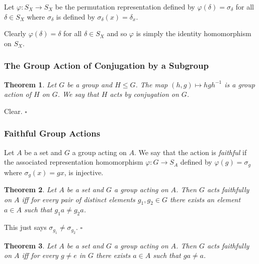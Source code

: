 \documentclass[10pt]{article}
\newtheorem{theorem}{Theorem}[section]
\newenvironment{proof}[1][Proof]{\begin{trivlist}
\item[\hskip \labelsep {\itshape #1}]}{\end{trivlist}}
\newenvironment{definition}[1][Definition]{\begin{trivlist}
\item[\hskip \labelsep {\bfseries #1}]}{\end{trivlist}}
\begin{document}
Let $\varphi : S_X \to S_X$ be the permutation representation defined by $\varphi(\delta) = \sigma_{\delta}$ for all $\delta \in S_X$ where $\sigma_\delta$ is defined by $\sigma_\delta(x) = \delta_x$.

Clearly $\varphi(\delta) = \delta$ for all $\delta \in S_X$ and so $\varphi$ is simply the identity homomorphism on $S_X$.

\subsubsection{The Group Action of Conjugation by a Subgroup}

\begin{theorem}
Let $G$ be a group and $H \leq G$. The map $(h, g) \mapsto hgh^{-1}$ is a group action of $H$ on $G$. We say that $H$ acts by conjugation on $G$.
\end{theorem}

\begin{proof}
Clear. $\square$
\end{proof}

\subsubsection{Faithful Group Actions}

\begin{definition}
Let $A$ be a set and $G$ a group acting on $A$. We say that the action is \emph{faithful} if the associated representation homomorphism $\varphi : G \to S_A$ defined by $\varphi(g) = \sigma_g$ where $\sigma_g(x) = gx$, is injective.
\end{definition}

\begin{theorem}
Let $A$ be a set and $G$ a group acting on $A$. Then $G$ acts faithfully on $A$ iff for every pair of distinct elements $g_1, g_2 \in G$ there exists an element $a \in A$ such that $g_1a \neq g_2a$.
\end{theorem}

\begin{proof}
This just says $\sigma_{g_1} \neq \sigma_{g_2}$. $\square$
\end{proof}

\begin{theorem}
Let $A$ be a set and $G$ a group acting on $A$. Then $G$ acts faithfully on $A$ iff for every $g \neq e$ in $G$ there exists $a \in A$ such that $ga \neq a$.
\end{theorem}
\end{document}
